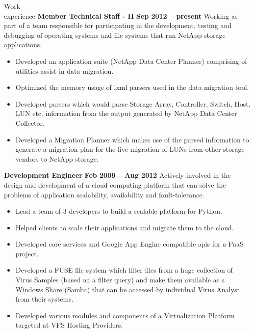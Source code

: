 \documentclass{resume}
\begin{document}
\begin{category}{Work \\experience}
  \citemnobullet \textbf{Member Technical Staff - II} \hfill \textbf{Sep 2012 -- present}
  \citemnobullet Working as part of a team responsible for participating in the development, 
  testing and debugging of operating systems and file systems that run NetApp storage applications.
  \begin{itemize}
  \item Developed an application suite (NetApp Data Center Planner) comprising of utilities 
  assist in data migration.
  \item Optimized the memory usage of lxml parsers used in the data migration tool.
  \item Developed parsers which would parse Storage Array, Controller, Switch, Host, LUN etc. 
  information from the output generated by NetApp Data Center Collector.
  \item Developed a Migration Planner which makes use of the parsed information to generate a 
  migration plan for the live migration of LUNs from other storage vendors to NetApp storage.
  \end{itemize}
  \citemnobullet \textbf{Development Engineer} \hfill \textbf{Feb 2009 -- Aug 2012}
  \citemnobullet Actively involved in the design and development of a cloud computing platform 
  that can solve the problems of application scalability, availability and fault-tolerance.
  \begin{itemize} 
  \item Lead a team of 3 developers to build a scalable platform for Python.
  \item Helped clients to scale their applications and migrate them to the cloud.
  \item Developed core services and Google App Engine compatible apis for a PaaS project.
  \item Developed a FUSE file system which filter files from a huge collection of Virus Samples 
  (based on a filter query) and make them available as a Windows Share (Samba) that can be accessed 
  by individual Virus Analyst from their systems.
  \item Developed various modules and components of a Virtualization Platform targeted at VPS Hosting
  Providers.
  \end{itemize}
\end{category}
\end{document}
